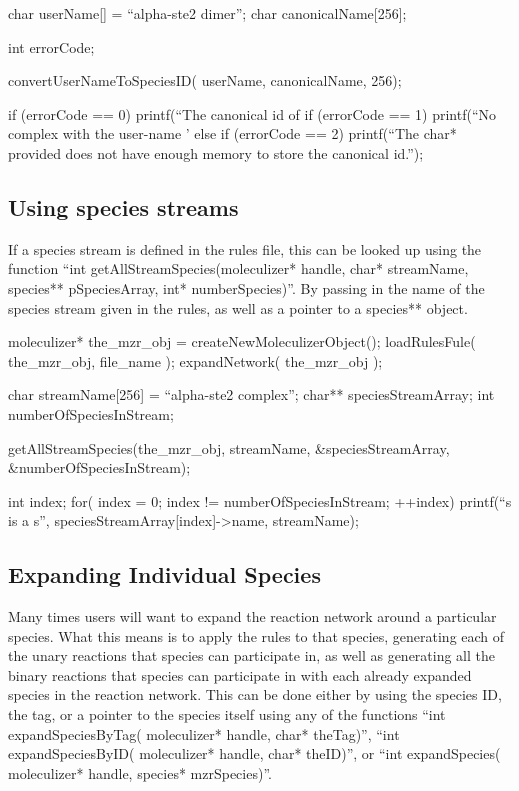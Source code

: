 \begin{ExampleC}[caption=Example usage of convertUserNameToSpeciesID,
  label=userNameCEx]

  char userName[] = ``alpha-ste2 dimer'';
  char canonicalName[256];
  
  int errorCode;

  convertUserNameToSpeciesID( userName, canonicalName, 256);

  if (errorCode == 0) printf(``The canonical id of %
  if (errorCode == 1) printf(``No complex with the user-name '%
  else if (errorCode == 2) printf(``The char* provided does not have
  enough memory to store the canonical id.'');

\end{ExampleC}

\subsection{Using species streams}
If a species stream is defined in the rules file, this can be looked
up using the function ``int getAllStreamSpecies(moleculizer* handle,
char* streamName, species** pSpeciesArray, int* numberSpecies)''. By
passing in the name of the species stream given in the rules, as well
as a pointer to a species** object.  

\begin{ExampleC}
moleculizer* the_mzr_obj = createNewMoleculizerObject();
loadRulesFule( the_mzr_obj, file_name );
expandNetwork( the_mzr_obj );

char streamName[256] = ``alpha-ste2 complex'';
char** speciesStreamArray;
int numberOfSpeciesInStream;

getAllStreamSpecies(the_mzr_obj, streamName, &speciesStreamArray,
&numberOfSpeciesInStream);

int index;
for( index = 0; index != numberOfSpeciesInStream; ++index)
{
  printf(``s is a s'', speciesStreamArray[index]->name, streamName);
}

\end{ExampleC}

\subsection{Expanding Individual Species}
Many times users will want to expand the reaction network around a
particular species.  What this means is to apply the rules to that
species, generating each of the unary reactions that species can
participate in, as well as generating all the binary reactions that
species can participate in with each already expanded species in the
reaction network.  This can be done either by using the species ID,
the tag, or a pointer to the species itself using any of the functions
``int expandSpeciesByTag( moleculizer* handle, char* theTag)'', ``int
expandSpeciesByID( moleculizer* handle, char* theID)'', or ``int
expandSpecies( moleculizer* handle, species* mzrSpecies)''.

